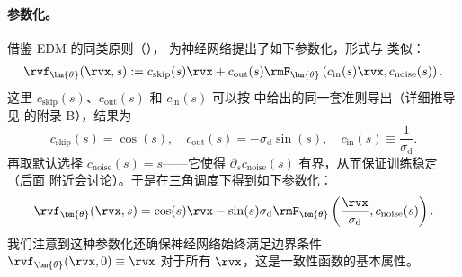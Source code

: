 \paragraph{参数化。}
借鉴 EDM 的同类原则（），\citet{lu2024simplifying} 为神经网络提出了如下参数化，形式与  类似：
\begin{align*}
    \rvf_{\bm{\theta}}(\rvx, s) := c_{\mathrm{skip}}(s)\rvx + c_{\mathrm{out}}(s)\rmF_{\bm{\theta}}\left(c_{\mathrm{in}}(s)\rvx, c_{\mathrm{noise}}(s)\right).
\end{align*}
这里 $c_{\mathrm{skip}}(s)$、$c_{\mathrm{out}}(s)$ 和 $c_{\mathrm{in}}(s)$ 可以按  中给出的同一套准则导出（详细推导见 \citet{lu2024simplifying} 的附录 B），结果为
\[
c_{\mathrm{skip}}(s) = \cos(s), \quad c_{\mathrm{out}}(s) = -\sigma_{\mathrm{d}} \sin(s), \quad c_{\mathrm{in}}(s) \equiv \frac{1}{\sigma_{\mathrm{d}}}.
\]
再取默认选择 $c_{\mathrm{noise}}(s) = s$——它使得 $\partial_s c_{\mathrm{noise}}(s)$ 有界，从而保证训练稳定（后面  附近会讨论）。于是在三角调度下得到如下参数化：
\begin{align}\label{eq:trig-nn}
    \rvf_{\bm{\theta}}(\rvx, s) = \cos(s)\rvx - \sin(s)\sigma_{\mathrm{d}}\rmF_{\bm{\theta}}\left(\frac{\rvx}{\sigma_{\mathrm{d}}}, c_{\mathrm{noise}}(s)\right).
\end{align}
我们注意到这种参数化还确保神经网络始终满足边界条件 $\rvf_{\bm{\theta}}(\rvx, 0) \equiv \rvx$ 对于所有 $\rvx$，这是一致性函数的基本属性。


